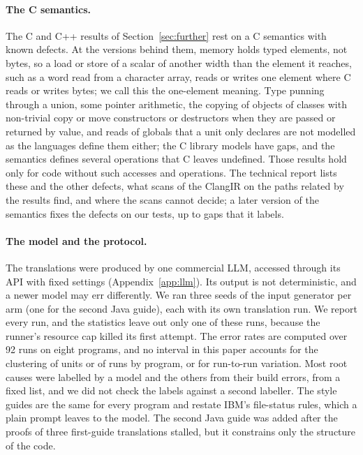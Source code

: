 \paragraph{The C semantics.} The C and C++ results of Section~\ref{sec:further} rest on a C semantics with known
defects. At the versions behind them, memory holds typed elements, not bytes, so a load or store of a scalar of another
width than the element it reaches, such as a word read from a character array, reads or writes one element where C
reads or writes bytes; we call this the one-element meaning. Type punning through a union, some pointer arithmetic, the copying of objects of classes with non-trivial copy or
move constructors or destructors when they are passed or returned by value, and reads of globals that a unit only
declares are not modelled as the languages define them either; the C library models have gaps, and the semantics
defines several operations that C leaves undefined. Those results hold only for code without such accesses and
operations. The technical report lists these and the other defects, what scans of the ClangIR on the paths related by the results find, and where the scans cannot decide; a later version of the semantics fixes the defects on our tests, up to gaps that it labels.

\paragraph{The model and the protocol.} The translations were produced by one commercial LLM, accessed through its API with
fixed settings (Appendix~\ref{app:llm}). Its output is not deterministic, and a newer model may err differently. We ran three seeds of the input generator per arm (one for the second Java guide), each with its own translation run. We report every run, and the statistics leave out only one of these runs, because the runner's resource cap killed its first
attempt. The error rates are computed over 92 runs on eight programs, and no interval in this paper accounts for the clustering of units or of runs by program, or for run-to-run
variation. Most root causes were labelled by a model and the others from their build errors, from a fixed list, and we did not check the labels against a second labeller. The style guides are the same for every
program and restate IBM's file-status rules, which a plain prompt leaves to the model. The second Java guide was added
after the proofs of three first-guide translations stalled, but it constrains only the structure of the code.

